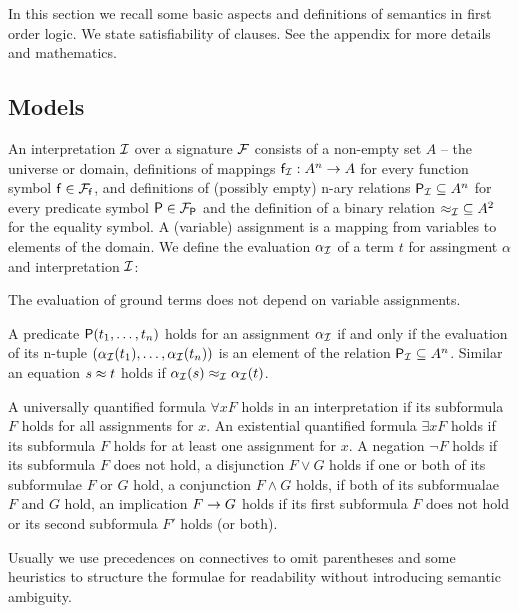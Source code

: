 In this section we recall some basic aspects and definitions of semantics in first order logic. 
We state satisfiability of clauses. See the appendix for more details and mathematics.

\subsection{Models}

\begin{definition}\label{def:interpretation}
	An {\myem interpretation} ${\mathcal I}$ over a signature ${\mathcal F}$ consists of a
	non-empty set $A$ -- the {\myem universe} or {\myem domain},
	definitions of mappings ${\mathsf f}_{\mathcal I}: A^n\rightarrow A$ for every function symbol ${\mathsf f}\in{{\mathcal F}_{\mathsf f}}$, 
	and definitions of (possibly empty) n-ary relations 
	 ${{\mathsf P}_{\mathcal I}}\subseteq A^n$ for every predicate symbol ${\mathsf P}\in{{\mathcal F}_{\mathsf P}}$
	 and the definition of a binary relation ${\approx_{\mathcal I}}\subseteq A^2$ for the equality symbol.
	 A (variable) {\myem assignment} is a mapping from variables to elements of the domain.
	 We define the {\myem evaluation} $\alpha_{\mathcal I}$ of a term $t$ 
	 for assingment $\alpha$ and interpretation ${\mathcal I}$:
\begin{remark}
	The evaluation of ground terms does not depend on variable assignments.
\end{remark}
\end{definition}

\begin{definition}\label{def:semantics:atoms}
	A predicate ${\mathsf P}(t_1,\ldots,t_n)$ 
	{\myem holds} for an assignment $\alpha_{\mathcal I}$ 
	if and only if the evaluation of its n-tuple $
	(\alpha_{\mathcal I}({t_1}),\ldots,\alpha_{\mathcal I}({t_n}))$
	is an element of the relation ${\mathsf P}_{\mathcal I}\subseteq A^n$.
	Similar an equation $s\approx t$ 
	holds if $\alpha_{\mathcal I}(s) \approx_{\mathcal I} \alpha_{\mathcal I}(t)$.
\end{definition}

\begin{definition}\label{def:semantics:FOF}
	A universally quantified formula $\forall x F$ holds in an interpretation if its subformula $F$ holds for all assignments for $x$.
	An existential quantified formula $\exists xF$ holds if its subformula $F$ holds for at least one assignment for $x$.
	A negation $\lnot F$ holds if its subformula $F$ does not hold, 
	a disjunction $F\lor G$ holds if one or both of its subformulae $F$ or $G$ hold,
	a conjunction $F\land G$ holds, if both of its subformualae $F$ and $G$ hold, 
	an implication $F\rightarrow G$ holds if its first subformula $F$ does not hold or its second subformula $F'$ holds (or both).
	\begin{remark}Usually we use precedences on connectives to omit parentheses 
		and some heuristics to structure the formulae for readability 
		without introducing semantic ambiguity.
	\end{remark}
\end{definition}

